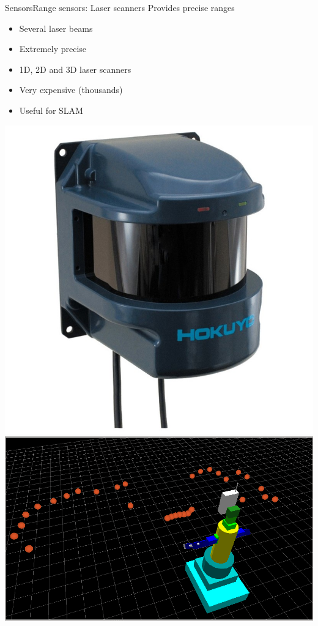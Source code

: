 \documentclass[10pt,compress]{beamer} %
\begin{document}
\begin{frame}{Sensors}{Range sensors: Laser scanners}
	Provides precise ranges
	\begin{itemize}
		\item Several laser beams
		\item Extremely precise
		\item 1D, 2D and 3D laser scanners
		\item Very expensive (thousands)
		\item Useful for SLAM
	\end{itemize}

	\begin{center}
	\includegraphics[width=0.2\linewidth]{figs/laser.jpg}\quad
	\includegraphics[width=0.4\linewidth]{figs/laserscan.png}
	\end{center}
\end{frame}
\end{document}
